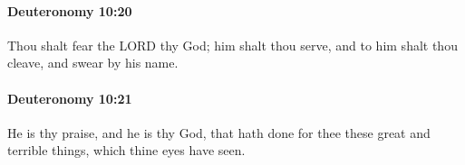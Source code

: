		\paragraph{Deuteronomy 10:20} %
			\label{DEUTERONOMY-10-20}

			Thou shalt fear the LORD thy God; him shalt thou serve, and to him shalt thou cleave, and swear by his name.


		\paragraph{Deuteronomy 10:21} %
			\label{DEUTERONOMY-10-21}

			He is thy praise, and he is thy God, that hath done for thee these great and terrible things, which thine eyes have seen.



